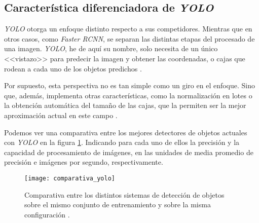 \subsection{Característica diferenciadora de \textit{YOLO}}

\textit{YOLO} otorga un enfoque distinto respecto a sus competidores. Mientras que en otros casos, como \textit{Faster RCNN}, se separan las distintas etapas del procesado de una imagen. \textit{YOLO}, he de aquí su nombre, solo necesita de un único <<vistazo>> para predecir la imagen y obtener las coordenadas, o cajas que rodean a cada uno de los objetos predichos \cite{yolo}.

Por supuesto, esta perspectiva no es tan simple como un giro en el enfoque. Sino que, además, implementa otras características, como la normalización en lotes o la obtención automática del tamaño de las cajas, que la permiten ser la mejor aproximación actual en este campo \cite{yolov2}.

Podemos ver una comparativa entre los mejores detectores de objetos actuales con \textit{YOLO} en la figura \ref{fig:3.2.13}. Indicando para cada uno de ellos la precisión y la capacidad de procesamiento de imágenes, en las unidades de media promedio de precisión e imágenes por segundo, respectivamente.

\begin{figure}[h]
\centering
\texttt{[image: comparativa\_yolo]}
\caption{Comparativa entre los distintos sistemas de detección de objetos sobre el mismo conjunto de entrenamiento y sobre la misma configuración \cite{yolov2}.}
\label{fig:3.2.13}
\end{figure}


